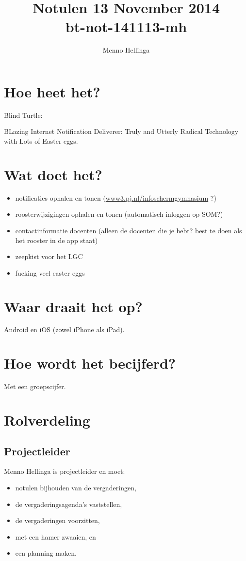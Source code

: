\documentclass[a4paper, 10pt]{article}
\begin{document}
\frenchspacing
\title{Notulen 13 November 2014\\bt-not-141113-mh}
\author{Menno Hellinga}
\date{\empty}

\maketitle
\newpage

\tableofcontents
\newpage

\section{Hoe heet het?}

Blind Turtle:

BLazing Internet Notification Deliverer: Truly and Utterly Radical Technology
with Lots of Easter eggs.

\section{Wat doet het?}

\begin{itemize}
	\item notificaties ophalen en tonen
	(\url{www3.pj.nl/infoschermgymnasium} ?)
	\item roosterwijzigingen ophalen en tonen (automatisch inloggen op SOM?)
	\item contactinformatie docenten (alleen de docenten die je hebt? best
	te doen als het rooster in de app staat)
	\item zeepkist voor het LGC
	\item fucking veel easter eggs
\end{itemize}

\section{Waar draait het op?}
Android en iOS (zowel iPhone als iPad).

\section{Hoe wordt het becijferd?}
Met een groepscijfer.

\section{Rolverdeling}

\subsection{Projectleider}
Menno Hellinga is projectleider en moet:
\begin{itemize}
	\item notulen bijhouden van de vergaderingen,
	\item de vergaderingsagenda's vaststellen,
	\item de vergaderingen voorzitten,
	\item met een hamer zwaaien, en
	\item een planning maken.
\end{itemize}
\end{document}
